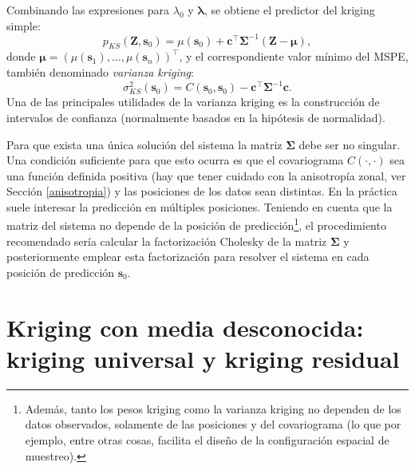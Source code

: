 \documentclass[
]{book}
\theoremstyle{break}
\theoremstyle{definition}
\theoremstyle{definition}
\theoremstyle{definition}
\theoremstyle{definition}
\theoremstyle{remark}
\begin{document}
Combinando las expresiones para \(\lambda_{0}\) y \(\boldsymbol{\lambda}\), se obtiene el predictor del kriging simple:
\[p_{KS}(\mathbf{Z}, \mathbf{s}_{0}) = \mu(\mathbf{s}_{0}) + \mathbf{c^\top }\boldsymbol{\Sigma}^{-1} (\mathbf{Z}-\boldsymbol{\mu}),\]
donde \(\boldsymbol{\mu}=\left( \mu(\mathbf{s}_{1}), \ldots,\mu(\mathbf{s}_{n} )\right)^\top\), y el correspondiente valor mínimo del MSPE, también denominado \emph{varianza kriging}:
\[\sigma_{KS}^{2} (\mathbf{s}_{0})=C(\mathbf{s}_{0},\mathbf{s}_{0}
)-\mathbf{c^\top }\boldsymbol{\Sigma}^{-1} \mathbf{c}.\]
Una de las principales utilidades de la varianza kriging es la construcción de intervalos de confianza (normalmente basados en la hipótesis de normalidad).

Para que exista una única solución del sistema la matriz \(\boldsymbol{\Sigma}\) debe ser no singular.
Una condición suficiente para que esto ocurra es que el covariograma \(C(\cdot ,\cdot)\) sea una función definida positiva (hay que tener cuidado con la anisotropía zonal, ver Sección \ref{anisotropia}) y las posiciones de los datos sean distintas.
En la práctica suele interesar la predicción en múltiples posiciones.
Teniendo en cuenta que la matriz del sistema no depende de la posición
de predicción\footnote{Además, tanto los pesos kriging como la varianza kriging no dependen de los datos observados, solamente de las posiciones y del covariograma (lo que por ejemplo, entre otras cosas, facilita el diseño de la configuración espacial de muestreo).}, el procedimiento recomendado sería calcular la factorización Cholesky de la matriz \(\boldsymbol{\Sigma}\) y posteriormente emplear esta factorización para resolver el sistema en cada posición de predicción \(\mathbf{s}_{0}\).

\section{Kriging con media desconocida: kriging universal y kriging residual}\label{kuniversal}
\end{document}
